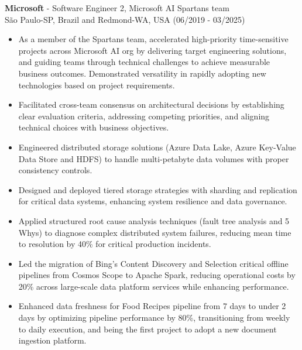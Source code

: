 
\normalsize{\textbf{Microsoft} - Software Engineer 2, Microsoft AI Spartans team}\\
    \footnotesize{São Paulo-SP, Brazil and Redmond-WA, USA (06/2019 - 03/2025)}

\begin{itemize}
    \item \small{As a member of the Spartans team, accelerated high-priority time-sensitive
        projects across Microsoft AI org by delivering target engineering solutions, and guiding teams
        through technical challenges to achieve measurable business outcomes. Demonstrated versatility
        in rapidly adopting new technologies based on project requirements.}

    \item \small{Facilitated cross-team consensus on architectural decisions by establishing clear 
        evaluation criteria, addressing competing priorities, and aligning technical choices with 
        business objectives.}

    \item \small{Engineered distributed storage solutions (Azure Data Lake, Azure Key-Value 
        Data Store and HDFS) to handle multi-petabyte data volumes with proper consistency controls.}

    \item \small{Designed and deployed tiered storage strategies with sharding and replication 
        for critical data systems, enhancing system resilience and data governance.}

    \item \footnotesize{Applied structured root cause analysis techniques (fault tree analysis and 5
        Whys) to diagnose complex distributed system failures, reducing mean time to resolution by 40\%
        for critical production incidents.}

    \item \small{Led the migration of Bing's Content Discovery and Selection critical offline
        pipelines from Cosmos Scope to Apache Spark, reducing operational costs by 20\% across
        large-scale data platform services while enhancing performance.}

    \item \small{Enhanced data freshness for Food Recipes pipeline from 7 days to under 2 days by
        optimizing pipeline performance by 80\%, transitioning from weekly to daily execution, and being 
        the first project to adopt a new document ingestion platform.}


\end{itemize}
